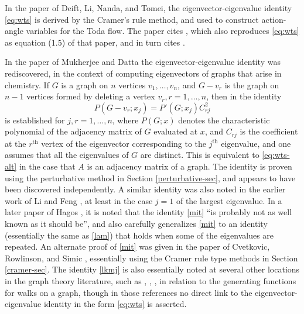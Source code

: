 \documentclass[12pt]{amsart}
\begin{document}
In the paper \cite[page 210]{DLNT} of Deift, Li, Nanda, and Tomei, the eigenvector-eigenvalue identity \eqref{eq:wts} is derived by the Cramer's rule method, and used to construct action-angle variables for the Toda flow.  The paper cites \cite{BG}, which also reproduces \eqref{eq:wts} as equation (1.5) of that paper, and in turn cites \cite{golub1973}.

In the paper of Mukherjee and Datta \cite{Mukherjee1989} the eigenvector-eigenvalue identity was rediscovered, in the context of computing eigenvectors of graphs that arise in chemistry.  If $G$ is a graph on $n$ vertices $v_1,\dots,v_n$, and $G - v_r$ is the graph on $n-1$ vertices formed by deleting a vertex $v_r, r=1,\dots,n$, then in \cite[(4)]{Mukherjee1989} the identity
\begin{equation}\label{mit}
 P(G - v_r; x_j) = P'(G; x_j) C^2_{rj}
\end{equation}
is established for $j,r=1,\dots,n$, where $P(G;x)$ denotes the characteristic polynomial of the adjacency matrix of $G$ evaluated at $x$, and $C_{rj}$ is the coefficient at the $r^{\mathrm{th}}$ vertex of the eigenvector corresponding to the $j^{\mathrm{th}}$ eigenvalue, and one assumes that all the eigenvalues of $G$ are distinct.  This is equivalent to \eqref{eq:wts-alt} in the case that $A$ is an adjacency matrix of a graph.  The identity is proven using the perturbative method in Section \ref{perturbative-sec}, and appears to have been discovered independently.  A similar identity was also noted in the earlier work of Li and Feng \cite{LF}, at least in the case $j=1$ of the largest eigenvalue.
In a later paper of Hagos \cite{HAGOS2002103}, it is noted that the identity \eqref{mit} ``is probably not as well known as it should be'', and also carefully generalizes \eqref{mit} to an identity (essentially the same as \eqref{lam}) that holds when some of the eigenvalues are repeated.  An alternate proof of \eqref{mit} was given in the paper of Cvetkovic, Rowlinson, and Simic \cite[Theorem 3.1]{CVETKOVIC2007146}, essentially using the Cramer rule type methods in Section \ref{cramer-sec}. The identity \eqref{lkmj} is also essentially noted at several other locations in the graph theory literature, such as \cite[Chapter 4]{godsil-book}, \cite[Lemma 2.1]{GK}, \cite[Lemma 7.1, Corollary 7.2]{godsil}, \cite[(2)]{GGKL} in relation to the generating functions for walks on a graph, though in those references no direct link to the eigenvector-eigenvalue identity in the form \eqref{eq:wts} is asserted.
\end{document}
